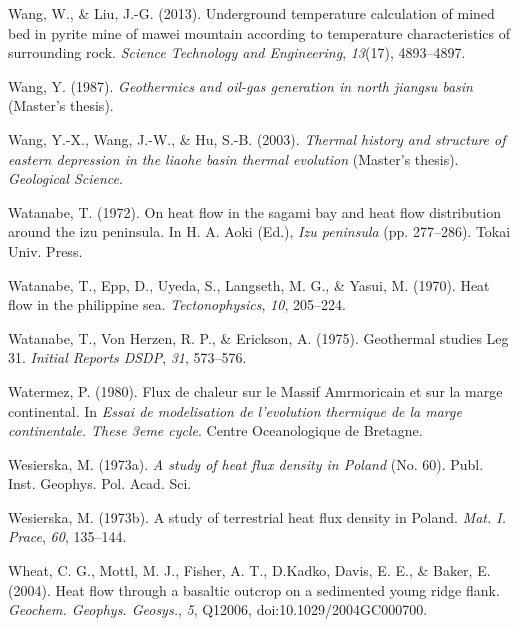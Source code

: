 \documentclass[draft,linenumbers]{agujournal2018}
\begin{document}
\leavevmode{}%
Wang, W., \& Liu, J.-G. (2013). Underground temperature calculation of
mined bed in pyrite mine of mawei mountain according to temperature
characteristics of surrounding rock. \emph{Science Technology and
Engineering}, \emph{13}(17), 4893--4897.

\leavevmode{}%
Wang, Y. (1987). \emph{Geothermics and oil-gas generation in north
jiangsu basin} (Master's thesis).

\leavevmode{}%
Wang, Y.-X., Wang, J.-W., \& Hu, S.-B. (2003). \emph{Thermal history and
structure of eastern depression in the liaohe basin thermal evolution}
(Master's thesis). \emph{Geological Science}.

\leavevmode{}%
Watanabe, T. (1972). On heat flow in the sagami bay and heat flow
distribution around the izu peninsula. In H. A. Aoki (Ed.), \emph{Izu
peninsula} (pp. 277--286). Tokai Univ. Press.

\leavevmode{}%
Watanabe, T., Epp, D., Uyeda, S., Langseth, M. G., \& Yasui, M. (1970).
Heat flow in the philippine sea. \emph{Tectonophysics}, \emph{10},
205--224.

\leavevmode{}%
Watanabe, T., Von Herzen, R. P., \& Erickson, A. (1975). Geothermal
studies {Leg} 31. \emph{Initial Reports DSDP}, \emph{31}, 573--576.

\leavevmode{}%
Watermez, P. (1980). Flux de chaleur sur le {Massif Amrmoricain} et sur
la marge continental. In \emph{Essai de modelisation de l'evolution
thermique de la marge continentale. These 3eme cycle}. Centre
Oceanologique de Bretagne.

\leavevmode{}%
Wesierska, M. (1973a). \emph{A study of heat flux density in {Poland}}
(No. 60). Publ. Inst. Geophys. Pol. Acad. Sci.

\leavevmode{}%
Wesierska, M. (1973b). A study of terrestrial heat flux density in
{Poland}. \emph{Mat. I. Prace}, \emph{60}, 135--144.

\leavevmode{}%
Wheat, C. G., Mottl, M. J., Fisher, A. T., D.Kadko, Davis, E. E., \&
Baker, E. (2004). Heat flow through a basaltic outcrop on a sedimented
young ridge flank. \emph{Geochem. Geophys. Geosys.}, \emph{5}, Q12006,
doi:10.1029/2004GC000700.
\end{document}
